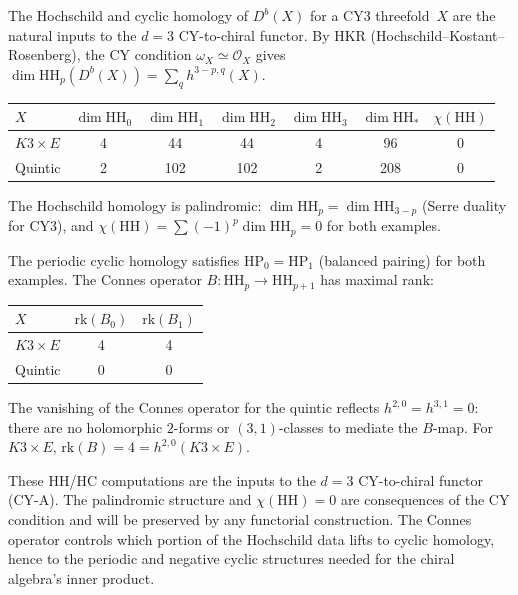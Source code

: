 \documentclass[11pt]{article}
\newcommand{\cO}{\mathcal{O}}
\newcommand{\HH}{\mathrm{HH}}
\begin{document}
The Hochschild and cyclic homology of $D^b(X)$ for a CY3 threefold~$X$
are the natural inputs to the $d = 3$ CY-to-chiral functor.
By HKR (Hochschild--Kostant--Rosenberg), the CY condition
$\omega_X \simeq \cO_X$ gives
$\dim \HH_p(D^b(X)) = \sum_q h^{3-p, q}(X)$.

\begin{proposition}
\label{prop:hh-data}
\hfill
\begin{center}
\renewcommand{\arraystretch}{1.3}
\begin{tabular}{lcccccc}
 \toprule
 $X$ & $\dim \HH_0$ & $\dim \HH_1$ & $\dim \HH_2$ & $\dim \HH_3$
 & $\dim \HH_*$ & $\chi(\HH)$ \\
 \midrule
 $K3 \times E$ & 4 & 44 & 44 & 4 & 96 & 0 \\
 Quintic & 2 & 102 & 102 & 2 & 208 & 0 \\
 \bottomrule
\end{tabular}
\end{center}
The Hochschild homology is palindromic: $\dim \HH_p = \dim \HH_{3-p}$
\textup{(}Serre duality for CY3\textup{)}, and
$\chi(\HH) = \sum (-1)^p \dim \HH_p = 0$ for both examples.
\end{proposition}

\begin{proposition}
\label{prop:hp-data}
The periodic cyclic homology satisfies $\mathrm{HP}_0 = \mathrm{HP}_1$ \textup{(}balanced
pairing\textup{)} for both examples. The Connes operator
$B \colon \HH_p \to \HH_{p+1}$
has maximal rank:
\begin{center}
\renewcommand{\arraystretch}{1.3}
\begin{tabular}{lcc}
 \toprule
 $X$ & $\mathrm{rk}(B_0)$ & $\mathrm{rk}(B_1)$ \\
 \midrule
 $K3 \times E$ & 4 & 4 \\
 Quintic & 0 & 0 \\
 \bottomrule
\end{tabular}
\end{center}
The vanishing of the Connes operator for the quintic
reflects $h^{2,0} = h^{3,1} = 0$: there are no holomorphic
$2$-forms or $(3,1)$-classes to mediate the $B$-map.
For $K3 \times E$, $\mathrm{rk}(B) = 4 = h^{2,0}(K3 \times E)$.
\end{proposition}

\begin{remark}
These HH/HC computations are the inputs to the $d = 3$
CY-to-chiral functor (CY-A). The palindromic structure and
$\chi(\HH) = 0$ are consequences of the CY condition and
will be preserved by any functorial construction.
The Connes operator controls which portion of the
Hochschild data lifts to cyclic homology, hence to
the periodic and negative cyclic structures needed for
the chiral algebra's inner product.
\end{remark}
\end{document}
